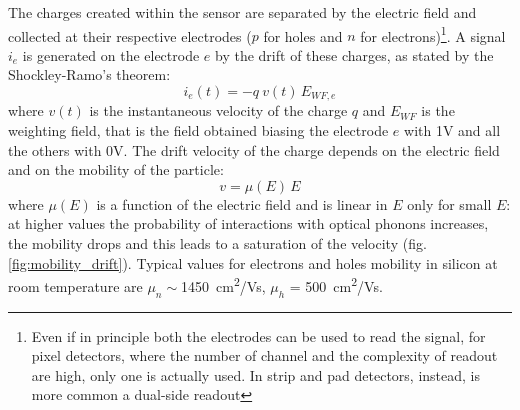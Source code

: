    The charges created within the sensor are separated by the electric field and collected at their respective electrodes ($p$ for holes and $n$ for electrons)\footnote{Even if in principle both the electrodes can be used to read the signal, for pixel detectors, where the number of channel and the complexity of readout are high, only one is actually used. In strip and pad detectors, instead, is more common a dual-side readout}. A signal $i_e$ is generated on the electrode $e$  by the drift of these charges, as stated by the Shockley-Ramo's theorem: 
   \begin{equation}
        i_e(t) = -q\: v(t)\, E_{WF,e}
   \end{equation}
   where $v(t)$ is the instantaneous velocity of the charge $q$ and $E_{WF}$ is the weighting field, that is the field obtained biasing the electrode $e$ with 1V and all the others with 0V. The drift velocity of the charge depends on the electric field and on the mobility of the particle:
   \begin{equation}
      v = \mu(E)\, E
   \end{equation}
   where $\mu(E)$ is a function of the electric field and is linear in $E$ only for small $E$: at higher values the probability of interactions with optical phonons increases, the mobility drops and this leads to a saturation of the velocity (fig.\ref{fig:mobility_drift}). Typical values for electrons and holes mobility in silicon at room temperature are $\mu _n \sim$\SI{1450}{cm\squared/Vs}, $\mu _h$ = \SI{500}{cm\squared/Vs}.
